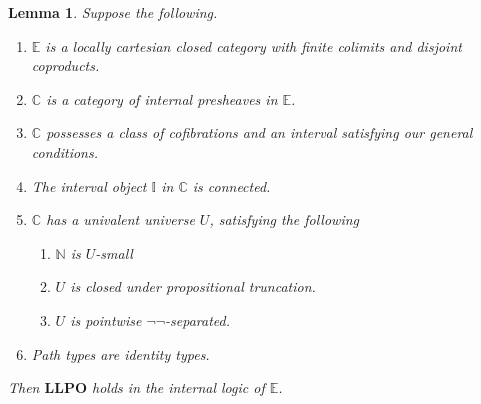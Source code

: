 \documentclass[a4paper]{amsart}
\newtheorem{lemma}[theorem]{Lemma}
\theoremstyle{definition}
\newcommand{\cat}[1]{\mathbb{#1}}
\newcommand{\catc}{\cat{C}}
\newcommand{\intv}{\mathbb{I}}
\newcommand{\nat}{\mathbb{N}}
\newcommand{\llpo}{\mathbf{LLPO}}
\begin{document}
\begin{lemma}
  \label{lem:pathareidtollpo}
  Suppose the following.
  \begin{enumerate}
  \item $\cat{E}$ is a locally cartesian closed category with finite
    colimits and disjoint coproducts.
  \item $\catc$ is a category of internal presheaves in $\cat{E}$.
  \item $\catc$ possesses a class of cofibrations and an interval
    satisfying our general conditions.
  \item The interval object $\intv$ in $\catc$ is connected.
  \item $\catc$ has a univalent universe $U$, satisfying the following
    \begin{enumerate}
    \item $\nat$ is $U$-small
    \item $U$ is closed under propositional truncation.
    \item $U$ is pointwise $\neg \neg$-separated.    
    \end{enumerate}
  \item Path types are identity types.
  \end{enumerate}

  Then $\llpo$ holds in the internal logic of $\cat{E}$.
\end{lemma}
\end{document}
